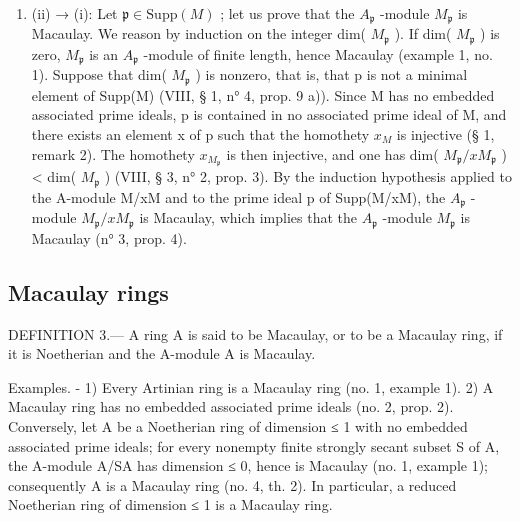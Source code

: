 \begin{enumerate}
\def\labelenumi{(\roman{enumi})}
\setcounter{enumi}{1}
\tightlist
\item
  (ii) → (i): Let \(\mathfrak{p} \in \text{Supp}(M)\) ; let us prove that the \(A_{\mathfrak{p}}\) -module \(M_{\mathfrak{p}}\) is Macaulay. We reason by induction on the integer dim( \(M_{\mathfrak{p}}\) ). If dim( \(M_{\mathfrak{p}}\) ) is zero, \(M_{\mathfrak{p}}\) is an \(A_{\mathfrak{p}}\) -module of finite length, hence Macaulay (example 1, no. 1). Suppose that dim( \(M_{\mathfrak{p}}\) ) is nonzero, that is, that p is not a minimal element of Supp(M) (VIII, § 1, n° 4, prop. 9 a)). Since M has no embedded associated prime ideals, p is contained in no associated prime ideal of M, and there exists an element x of p such that the homothety \(x_{M}\) is injective (§ 1, remark 2). The homothety \(x_{M_{\mathfrak{p}}}\) is then injective, and one has dim( \(M_{\mathfrak{p}}/xM_{\mathfrak{p}}\) ) \textless{} dim( \(M_{\mathfrak{p}}\) ) (VIII, § 3, n° 2, prop. 3). By the induction hypothesis applied to the A-module M/xM and to the prime ideal p of Supp(M/xM), the \(A_{\mathfrak{p}}\) -module \(M_{\mathfrak{p}}/xM_{\mathfrak{p}}\) is Macaulay, which implies that the \(A_{\mathfrak{p}}\) -module \(M_{\mathfrak{p}}\) is Macaulay (n° 3, prop. 4).
\end{enumerate}

\subsection{Macaulay rings}

DEFINITION 3.--- A ring A is said to be Macaulay, or to be a Macaulay ring, if it is Noetherian and the A-module A is Macaulay.

Examples. - 1) Every Artinian ring is a Macaulay ring (no. 1, example 1). 2) A Macaulay ring has no embedded associated prime ideals (no. 2, prop. 2). Conversely, let A be a Noetherian ring of dimension ≤ 1 with no embedded associated prime ideals; for every nonempty finite strongly secant subset S of A, the A-module A/SA has dimension ≤ 0, hence is Macaulay (no. 1, example 1); consequently A is a Macaulay ring (no. 4, th. 2). In particular, a reduced Noetherian ring of dimension ≤ 1 is a Macaulay ring.

